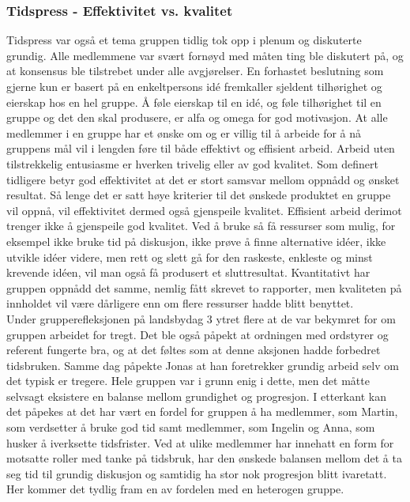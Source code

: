 \subsubsection{Tidspress - Effektivitet vs. kvalitet}
Tidspress var også et tema gruppen tidlig tok opp i plenum og diskuterte grundig.
Alle medlemmene var svært fornøyd med måten ting ble diskutert på, og at konsensus ble tilstrebet under alle avgjørelser.
En forhastet beslutning som gjerne kun er basert på en enkeltpersons id\'{e} fremkaller sjeldent tilhørighet og eierskap hos en hel gruppe.
Å føle eierskap til en id\'{e}, og føle tilhørighet til en gruppe og det den skal produsere, er alfa og omega for god motivasjon.
At alle medlemmer i en gruppe har et ønske om og er villig til å arbeide for å nå gruppens mål vil i lengden føre til både effektivt og effisient arbeid.
Arbeid uten tilstrekkelig entusiasme er hverken trivelig eller av god kvalitet.
Som definert tidligere betyr god effektivitet at det er stort samsvar mellom oppnådd og ønsket resultat.
Så lenge det er satt høye kriterier til det ønskede produktet en gruppe vil oppnå, vil effektivitet dermed også gjenspeile kvalitet.
Effisient arbeid derimot trenger ikke å gjenspeile god kvalitet.
Ved å bruke så få ressurser som mulig, for eksempel ikke bruke tid på diskusjon, ikke prøve å finne alternative id\'{e}er, ikke utvikle id\'{e}er videre, men rett og slett gå for den raskeste, enkleste og minst krevende id\'{e}en, vil man også få produsert et sluttresultat.
Kvantitativt har gruppen oppnådd det samme, nemlig fått skrevet to rapporter, men kvaliteten på innholdet vil være dårligere enn om flere ressurser hadde blitt benyttet.\\

Under grupperefleksjonen på landsbydag 3 ytret flere at de var bekymret for om gruppen arbeidet for tregt.
Det ble også påpekt at ordningen med ordstyrer og referent fungerte bra, og at det føltes som at denne aksjonen hadde forbedret tidsbruken.
Samme dag påpekte Jonas at han foretrekker grundig arbeid selv om det typisk er tregere.
Hele gruppen var i grunn enig i dette, men det måtte selvsagt eksistere en balanse mellom grundighet og progresjon.
I etterkant kan det påpekes at det har vært en fordel for gruppen å ha medlemmer, som Martin, som verdsetter å bruke god tid samt medlemmer, som Ingelin og Anna, som husker å iverksette tidsfrister.
Ved at ulike medlemmer har innehatt en form for motsatte roller med tanke på tidsbruk, har den ønskede balansen mellom det å ta seg tid til grundig diskusjon og samtidig ha stor nok progresjon blitt ivaretatt. 
Her kommer det tydlig fram en av fordelen med en heterogen gruppe.\\

